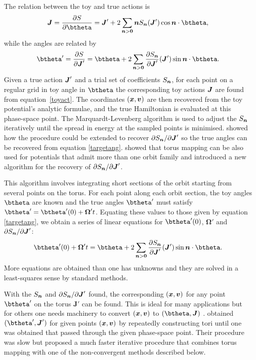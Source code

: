 \documentclass[useAMS,usenatbib,fleqn,a4paper]{mn2e}
\newcommand{\bs}[1]{\bmath{#1}}
\begin{document}
The relation between the toy and true
actions is
\begin{equation}
\bs{J}=\frac{\partial S}{\partial \btheta} = \bs{J}'+2\sum_{\bs{n}>\bs{0}}\bs{n}S_{\bs{n}}(\bs{J}')\cos\bs{n}\cdot\btheta,
\label{toyact}
\end{equation}
while the angles are related by
\begin{equation}
\btheta'=\frac{\partial S}{\partial \bs{J}'}
= \btheta+2\sum_{\bs{n}>\bs{0}}\frac{\partial S_{\bs{n}}}{\partial \bs{J}'}(\bs{J}')\sin\bs{n}\cdot\btheta.
\label{targetang}
\end{equation}
 Given a true action $\bs{J}'$ and a trial set of coefficients
$S_{\bs{n}}$, for each point on a regular grid in toy angle in $\btheta$ the
corresponding toy actions $\bs{J}$ are found from equation~\eqref{toyact}.
The coordinates $(\bs{x},\bs{v})$ are then recovered from the toy
potential's analytic formulae, and the true Hamiltonian is evaluated at
this phase-space point.  The Marquardt-Levenberg algorithm is used to adjust
the $S_{\bs{n}}$ iteratively until the spread in energy at the sampled points
is minimised. \cite{BinneyKumar} showed how the procedure could be extended
to recover $\partial S_{\bs{n}}/\partial\bs{J}'$ so the true angles can be
recovered from equation \eqref{targetang}.  \cite{KaasalainenB} showed that
torus mapping can be also used for potentials that admit more than one orbit
family and introduced a new algorithm for the recovery of $\partial
S_{\bs{n}}/\partial\bs{J}'$.

This algorithm involves integrating short sections of the orbit starting from
several points on the torus. For each point along each orbit section, the toy
angles $\btheta$ are known and the true angles $\btheta'$ must satisfy
$\btheta'=\btheta'(0)+\boldsymbol{\Omega}'t$. Equating these values to those
given by equation \eqref{targetang}, we obtain a series of
linear equations for $\btheta'(0)$, $\boldsymbol{\Omega}'$ and $\partial
S_{\bs{n}}/\partial\bs{J}'$:
\begin{equation}
\btheta'(0)+\boldsymbol{\Omega}'t
= \btheta+2\sum_{\bs{n}>\bs{0}}\frac{\partial S_{\bs{n}}}{\partial \bs{J}'}(\bs{J}')\sin\bs{n}\cdot\btheta.
\label{toyang}
\end{equation}
 More equations are obtained than one has unknowns and they are solved in a
least-squares sense by standard methods.

With the $S_{\bs{n}}$ and $\partial S_{\bs{n}}/\partial \bs{J}'$ found, the
corresponding $(\bs{x},\bs{v})$ for any point $\btheta'$ on the torus
$\boldsymbol{J}'$ can be found. This is ideal for many applications but for
others one needs machinery to convert $(\bs{x},\bs{v})$ to
$(\btheta,\boldsymbol{J})$ \citep{McMillanBinney2013}.
\cite{McMillanBinney2008} obtained $(\btheta',\boldsymbol{J}')$ for given
points $(\bs{x},\bs{v})$ by repeatedly constructing tori until one was
obtained that passed through the given phase-space point. Their procedure was
slow but \cite{SandersBinney2015} proposed a much faster iterative
procedure that combines torus mapping with one of the non-convergent methods
described below.
\end{document}
